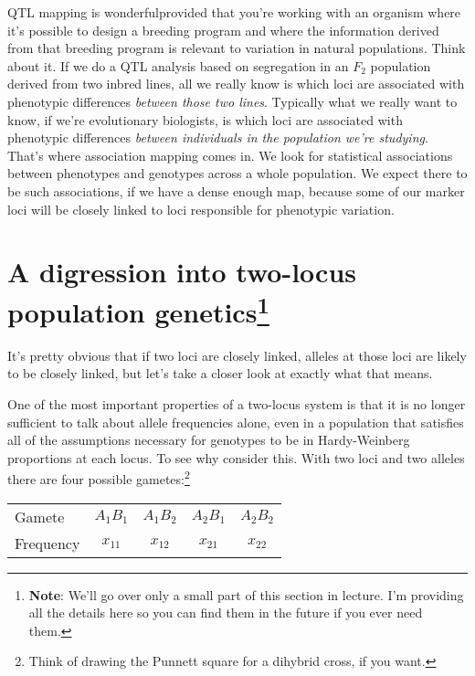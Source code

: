 QTL mapping is wonderful{\dash}provided that you're working with an
organism where it's possible to design a breeding program and where
the information derived from that breeding program is relevant to
variation in natural populations. Think about it. If we do a QTL
analysis based on segregation in an $F_2$ population derived from two
inbred lines, all we really know is which loci are associated with
phenotypic differences {\it between those two lines}. Typically what
we really want to know, if we're evolutionary biologists, is which
loci are associated with phenotypic differences {\it between
  individuals in the population we're studying}. That's where
association mapping comes in. We look for statistical associations
between phenotypes and genotypes across a whole population. We expect
there to be such associations, if we have a dense enough map, because
some of our marker loci will be closely linked to loci responsible for
phenotypic variation.

\section*{A digression into two-locus population
  genetics\footnote{{\bf Note}: We'll go over only a small part of
  this section in lecture. I'm providing all the details here so you
  can find them in the future if you ever need them.}}

It's pretty obvious that if two loci are closely linked, alleles at
those loci are likely to be closely linked, but let's take a closer
look at exactly what that means. 

One of the most important properties of a two-locus system is that it
is no longer sufficient to talk about allele frequencies alone, even
in a population that satisfies all of the assumptions necessary for
genotypes to be in Hardy-Weinberg proportions at each locus. To see
why consider this. With two loci and two alleles there are four
possible gametes:\footnote{Think of drawing the Punnett square for a
  dihybrid cross, if you want.}

\begin{center}
\begin{tabular}{lcccc}
Gamete    & $A_1B_1$ & $A_1B_2$ & $A_2B_1$ & $A_2B_2$ \\
Frequency & $x_{11}$ & $x_{12}$ & $x_{21}$ & $x_{22}$
\end{tabular}
\end{center}

